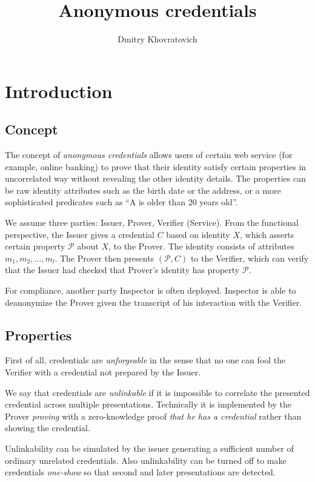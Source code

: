 \documentclass[a4paper]{article}
\title{Anonymous credentials}
\author{Dmitry Khovratovich}
\begin{document}
\maketitle

\section{Introduction}\label{sec:intro}

\subsection{Concept}

The concept of \emph{anonymous credentials} allows users of certain web service (for example, online banking) to prove that their identity satisfy certain properties in uncorrelated way without revealing the other identity details.  The properties can be raw identity attributes  such as
the birth date or the address, or a more sophisticated predicates such as ``A is older than 20 years old''.

We assume three parties: Issuer, Prover, Verifier (Service). From the functional perspective, the Issuer gives a credential $C$ based on identity $X$, which asserts certain property $\mathcal{P}$ about $X$, to the Prover. The identity consists of attributes $m_1, m_2,\ldots, m_l$. The Prover then presents $(\mathcal{P},C)$  to the Verifier, which 
can verify that the Issuer had checked that Prover's identity has property $\mathcal{P}$. 

For compliance, another party Inspector is often deployed. Inspector is able to deanonymize the Prover given the transcript of his interaction with the Verifier.  

\subsection{Properties}

First of all, credentials are \emph{unforgeable} in the sense that no one can fool the Verifier with a credential not prepared by the Issuer.

We say that credentials are  \emph{unlinkable} if it is impossible to correlate the presented credential across multiple presentations. Technically it is implemented by the Prover \emph{proving} with a zero-knowledge proof \emph{that he has a credential} rather than showing the credential.

Unlinkability can be simulated by the issuer generating a sufficient number of ordinary unrelated credentials. Also unlinkability can be turned off to make credentials \emph{one-show} so that second and later presentations are detected.
\end{document}
